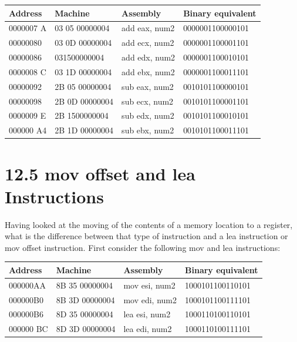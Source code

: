 \documentclass[10pt]{book}
\begin{document}
\begin{center}
\begin{tabular}{|l|l|l|l|}
\hline
Address & Machine & Assembly & Binary equivalent \\
\hline
0000007 A & 03 05 00000004 & add eax, num2 & 0000001100000101 \\
\hline
00000080 & 03 0D 00000004 & add ecx, num2 & 0000001100001101 \\
\hline
00000086 & 031500000004 & add edx, num2 & 0000001100010101 \\
\hline
0000008 C & 03 1D 00000004 & add ebx, num2 & 0000001100011101 \\
\hline
00000092 & 2B 05 00000004 & sub eax, num2 & 0010101100000101 \\
\hline
00000098 & 2B 0D 00000004 & sub ecx, num2 & 0010101100001101 \\
\hline
0000009 E & 2B 1500000004 & sub edx, num2 & 0010101100010101 \\
\hline
000000 A4 & 2B 1D 00000004 & sub ebx, num2 & 0010101100011101 \\
\hline
\end{tabular}
\end{center}

\section*{12.5 mov offset and lea Instructions}
Having looked at the moving of the contents of a memory location to a register, what is the difference between that type of instruction and a lea instruction or mov offset instruction. First consider the following mov and lea instructions:

\begin{center}
\begin{tabular}{|l|l|l|l|}
\hline
Address & Machine & Assembly & Binary equivalent \\
\hline
000000AA & 8B 35 00000004 & mov esi, num2 & 1000101100110101 \\
\hline
000000B0 & 8B 3D 00000004 & mov edi, num2 & 1000101100111101 \\
\hline
000000B6 & 8D 35 00000004 & lea esi, num2 & 1000110100110101 \\
\hline
000000 BC & 8D 3D 00000004 & lea edi, num2 & 1000110100111101 \\
\hline
\end{tabular}
\end{center}
\end{document}
